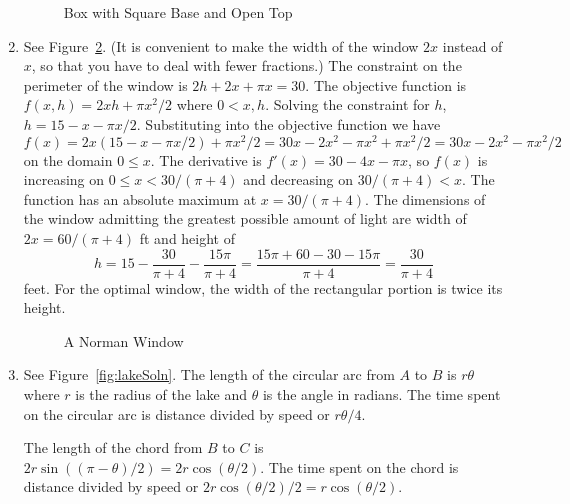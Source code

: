 \documentclass{article}
\begin{document}
\begin{enumerate}
\begin{figure}[htbp]
    \caption{Box with Square Base and Open Top}
    \label{fig:boxSoln}
  \end{figure}
\item %
  See Figure~\ref{fig:normanSoln}.  (It is convenient to make the
  width of the window $2x$ instead of $x$, so that you have to deal
  with fewer fractions.)  The constraint on the perimeter of the
  window is $2h+2x+\pi x = 30$.  The objective function is
  $f(x,h)=2xh + \pi x^2/2$ where $0<x,h$.  Solving the constraint for
  $h$, $h=15 - x - \pi x/2$.  Substituting into the objective function
  we have
  \begin{displaymath}
    f(x) = 2x(15-x-\pi x/2) + \pi x^2/2
    = 30 x - 2x^2 - \pi x^2 + \pi x^2/2 = 30 x - 2x^2 - \pi x^2/2
  \end{displaymath}
  on the domain $0\le x$.  The derivative is
  $f'(x)=30-4x-\pi x$, so $f(x)$ is increasing on $0\le x<30/(\pi+4)$ and
  decreasing on $30/(\pi+4)<x$.  The function has an absolute maximum
  at $x=30/(\pi+4)$.  The dimensions of the window admitting the greatest
  possible amount of light are width of $2x=60/(\pi+4)$ ft and height of
  \begin{displaymath}
    h=15-\frac{30}{\pi+4} - \frac{15\pi}{\pi+4}
    = \frac{15\pi+60 - 30 - 15\pi}{\pi+4}
    = \frac{30}{\pi+4}
  \end{displaymath}
  feet.  For the optimal window, the width of the rectangular portion
  is twice its height.
  \begin{figure}[htbp]
    \centering
    \caption{A Norman Window}
    \label{fig:normanSoln}
  \end{figure}
\item %
  See Figure~\ref{fig:lakeSoln}.  The length of the circular arc from
  $A$ to $B$ is $r\theta$ where $r$ is the radius of the lake and
  $\theta$ is the angle in radians.  The time spent on the circular
  arc is distance divided by speed or $r\theta/4$.

  The length of the chord from $B$ to $C$ is
  $2 r \sin((\pi-\theta)/2) = 2 r \cos(\theta/2)$.  The time spent on
  the chord is distance divided by speed or
  $2r\cos(\theta/2)/2 = r\cos(\theta/2)$.


\end{enumerate}
\end{document}
